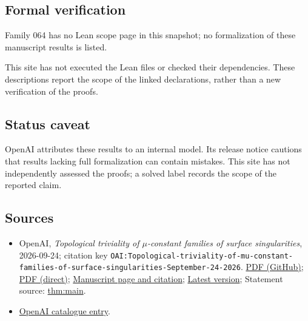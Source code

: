 \documentclass[11pt]{article}
\begin{document}
\subsection{Formal verification}
Family 064 has no Lean scope page in this snapshot; no formalization of these manuscript results is listed.

This site has not executed the Lean files or checked their dependencies. These descriptions report the scope of the linked declarations, rather than a new verification of the proofs.

\subsection{Status caveat}
OpenAI attributes these results to an internal model. Its release notice cautions that results lacking full formalization can contain mistakes. This site has not independently assessed the proofs; a solved label records the scope of the reported claim.

\subsection{Sources}
\begin{itemize}
\item OpenAI, \emph{Topological triviality of \(\mu\)-constant families of surface singularities}, 2026-09-24; citation key \texttt{OAI:Topological-triviality-of-mu-constant-families-of-surface-singularities-September-24-2026}. \href{https://github.com/openai/math/blob/adc7f1241b42e322a6451854ab7e4b4c146bf78a/preprints/Topological-triviality-of-mu-constant-families-of-surface-singularities-September-24-2026/main.pdf}{PDF (GitHub)}; \href{https://github.com/openai/math/raw/adc7f1241b42e322a6451854ab7e4b4c146bf78a/preprints/Topological-triviality-of-mu-constant-families-of-surface-singularities-September-24-2026/main.pdf}{PDF (direct)}; \href{https://github.com/openai/math/blob/adc7f1241b42e322a6451854ab7e4b4c146bf78a/preprints/Topological-triviality-of-mu-constant-families-of-surface-singularities-September-24-2026/README.md}{Manuscript page and citation}; \href{https://github.com/openai/math/blob/main/preprints/Topological-triviality-of-mu-constant-families-of-surface-singularities-September-24-2026/main.pdf}{Latest version}; Statement source: \href{https://github.com/openai/math/blob/adc7f1241b42e322a6451854ab7e4b4c146bf78a/preprints/Topological-triviality-of-mu-constant-families-of-surface-singularities-September-24-2026/build/sections/01-introduction.tex\#L32}{thm:main}.
\item \href{https://github.com/openai/math/blob/adc7f1241b42e322a6451854ab7e4b4c146bf78a/CONTENTS.md}{OpenAI catalogue entry}.
\end{itemize}
\end{document}
